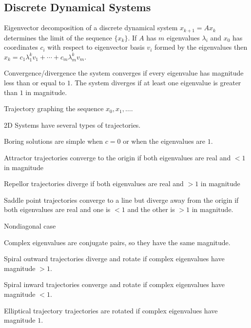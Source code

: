 \begin{card}
    \subsection{Discrete Dynamical Systems}

    \begin{compactdesc}
    \item[Eigenvector decomposition] of a discrete dynamical system
        $x_{k+1} = Ax_k$ determines the limit of the sequence $\{x_k\}$.
        If $A$ has $m$ eigenvalues $\lambda_i$ and $x_0$ has coordinates
        $c_i$ with respect to eigenvector basis $v_i$ formed by the eigenvalues then
        $x_k = c_1\lambda_1^kv_1 + \dotsb + c_m\lambda_m^kv_m$.
    \item[Convergence/divergence] the system converges if every eigenvalue
        has magnitude less than or equal to $1$.
        The system diverges if at least one eigenvalue is greater than $1$
        in magnitude.
    \item[Trajectory] graphing the sequence $x_0, x_1, \dotsc$.
    \item[2D Systems] have several types of trajectories.
    \item[Boring] solutions are simple when $c = 0$ or when the eigenvalues are $1$.
    \item[Attractor] trajectories converge to the origin if both eigenvalues
        are real and $< 1$ in magnitude
    \item[Repellor] trajectories diverge if both eigenvalues
        are real and $> 1$ in magnitude
    \item[Saddle point] trajectories converge to a line but diverge away from the
        origin if both eigenvalues are real and
        one is $<1$ and the other is $>1$ in magnitude.
    \item[Nondiagonal case] %
    \item[Complex eigenvalues] are conjugate pairs, so they have the same
        magnitude.
    \item[Spiral outward] trajectories diverge and rotate
        if complex eigenvalues have magnitude $>1$.
    \item[Spiral inward] trajectories converge and rotate
        if complex eigenvalues have magnitude $<1$.
    \item[Elliptical trajectory] trajectories are rotated
        if complex eigenvalues have magnitude $1$.
    \end{compactdesc}

\end{card}


